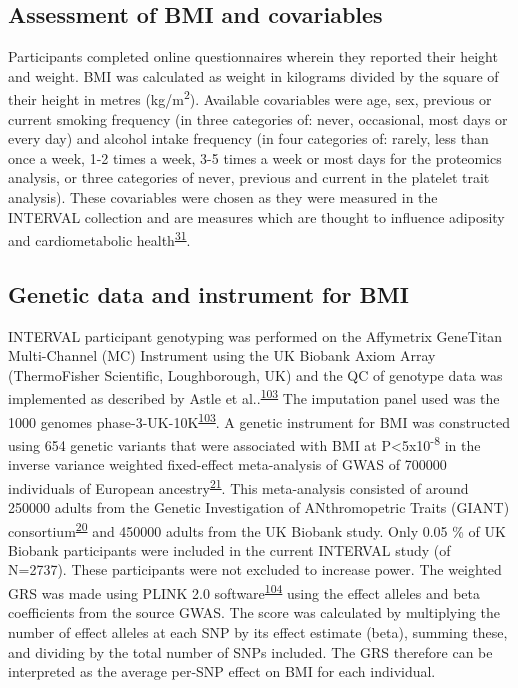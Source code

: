 \documentclass[11pt,twoside]{bristolthesis}
\begin{document}
\hypertarget{assessment-of-bmi-and-covariables}{%
\subsection{Assessment of BMI and covariables}\label{assessment-of-bmi-and-covariables}}

Participants completed online questionnaires wherein they reported their height and weight. BMI was calculated as weight in kilograms divided by the square of their height in metres (kg/m\textsuperscript{2}). Available covariables were age, sex, previous or current smoking frequency (in three categories of: never, occasional, most days or every day) and alcohol intake frequency (in four categories of: rarely, less than once a week, 1-2 times a week, 3-5 times a week or most days for the proteomics analysis, or three categories of never, previous and current in the platelet trait analysis). These covariables were chosen as they were measured in the INTERVAL collection and are measures which are thought to influence adiposity and cardiometabolic health\textsuperscript{\protect\hyperlink{ref-Bell2018a}{31}}.

\hypertarget{genetic-data-and-instrument-for-bmi}{%
\subsection{Genetic data and instrument for BMI}\label{genetic-data-and-instrument-for-bmi}}

INTERVAL participant genotyping was performed on the Affymetrix GeneTitan Multi-Channel (MC) Instrument using the UK Biobank Axiom Array (ThermoFisher Scientific, Loughborough, UK) and the QC of genotype data was implemented as described by Astle et al..\textsuperscript{\protect\hyperlink{ref-Astle2016}{103}} The imputation panel used was the 1000 genomes phase-3-UK-10K\textsuperscript{\protect\hyperlink{ref-Astle2016}{103}}. A genetic instrument for BMI was constructed using 654 genetic variants that were associated with BMI at P\textless5x10\textsuperscript{-8} in the inverse variance weighted fixed-effect meta-analysis of GWAS of 700000 individuals of European ancestry\textsuperscript{\protect\hyperlink{ref-Yengo2018}{21}}. This meta-analysis consisted of around 250000 adults from the Genetic Investigation of ANthromopetric Traits (GIANT) consortium\textsuperscript{\protect\hyperlink{ref-Locke2015}{20}} and 450000 adults from the UK Biobank study. Only 0.05 \% of UK Biobank participants were included in the current INTERVAL study (of N=2737). These participants were not excluded to increase power. The weighted GRS was made using PLINK 2.0 software\textsuperscript{\protect\hyperlink{ref-Purcell2007a}{104}} using the effect alleles and beta coefficients from the source GWAS. The score was calculated by multiplying the number of effect alleles at each SNP by its effect estimate (beta), summing these, and dividing by the total number of SNPs included. The GRS therefore can be interpreted as the average per-SNP effect on BMI for each individual.
\end{document}
